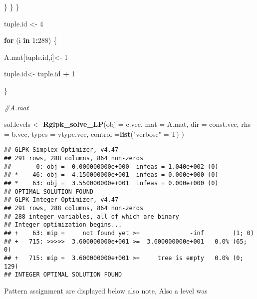 \documentclass[
]{article}
\newenvironment{Shaded}{\begin{snugshade}}{\end{snugshade}}
\newcommand{\CommentTok}[1]{\textcolor[rgb]{0.56,0.35,0.01}{\textit{#1}}}
\newcommand{\ControlFlowTok}[1]{\textcolor[rgb]{0.13,0.29,0.53}{\textbf{#1}}}
\newcommand{\DataTypeTok}[1]{\textcolor[rgb]{0.13,0.29,0.53}{#1}}
\newcommand{\DecValTok}[1]{\textcolor[rgb]{0.00,0.00,0.81}{#1}}
\newcommand{\KeywordTok}[1]{\textcolor[rgb]{0.13,0.29,0.53}{\textbf{#1}}}
\newcommand{\NormalTok}[1]{#1}
\newcommand{\OperatorTok}[1]{\textcolor[rgb]{0.81,0.36,0.00}{\textbf{#1}}}
\newcommand{\StringTok}[1]{\textcolor[rgb]{0.31,0.60,0.02}{#1}}
\begin{document}
\begin{Shaded}
\begin{Highlighting}[]
\NormalTok{    \}}
\NormalTok{  \}    }
\NormalTok{\}}

      
      
\NormalTok{tuple.id <-}\StringTok{ }\DecValTok{4}


 \ControlFlowTok{for}\NormalTok{ (i }\ControlFlowTok{in} \DecValTok{1}\OperatorTok{:}\DecValTok{288}\NormalTok{) \{}
  
\NormalTok{  A.mat[tuple.id,i]<-}\StringTok{ }\DecValTok{1}
  
\NormalTok{  tuple.id<-}\StringTok{ }\NormalTok{tuple.id }\OperatorTok{+}\StringTok{ }\DecValTok{1}
  
\NormalTok{\}}

\CommentTok{#A.mat}

\NormalTok{sol.levels <-}\StringTok{ }\KeywordTok{Rglpk_solve_LP}\NormalTok{(}\DataTypeTok{obj =}\NormalTok{ c.vec, }\DataTypeTok{mat =}\NormalTok{ A.mat, }\DataTypeTok{dir =}\NormalTok{ const.vec, }\DataTypeTok{rhs =}\NormalTok{ b.vec, }\DataTypeTok{types =}\NormalTok{ vtype.vec, }\DataTypeTok{control =}\KeywordTok{list}\NormalTok{(}\StringTok{"verbose"}\NormalTok{ =}\StringTok{ }\NormalTok{T) )}
\end{Highlighting}
\end{Shaded}

\begin{verbatim}
## GLPK Simplex Optimizer, v4.47
## 291 rows, 288 columns, 864 non-zeros
##       0: obj =  0.000000000e+000  infeas = 1.040e+002 (0)
## *    46: obj =  4.150000000e+001  infeas = 0.000e+000 (0)
## *    63: obj =  3.550000000e+001  infeas = 0.000e+000 (0)
## OPTIMAL SOLUTION FOUND
## GLPK Integer Optimizer, v4.47
## 291 rows, 288 columns, 864 non-zeros
## 288 integer variables, all of which are binary
## Integer optimization begins...
## +    63: mip =     not found yet >=              -inf        (1; 0)
## +   715: >>>>>  3.600000000e+001 >=  3.600000000e+001   0.0% (65; 0)
## +   715: mip =  3.600000000e+001 >=     tree is empty   0.0% (0; 129)
## INTEGER OPTIMAL SOLUTION FOUND
\end{verbatim}

\begin{Shaded}
\end{Shaded}

Pattern assignment are displayed below also note, Also a level was

\begin{Shaded}
\end{Shaded}
\end{document}
